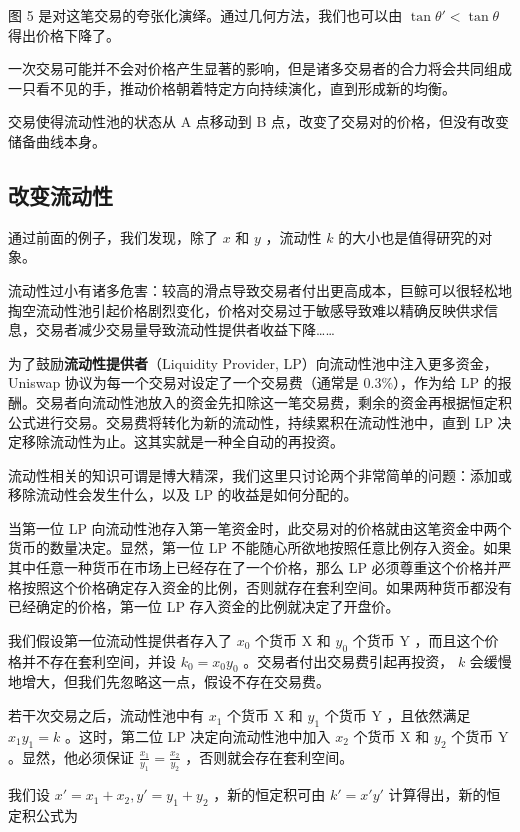 \documentclass[12pt, a4paper, oneside]{ctexart}
\begin{document}
图 5 是对这笔交易的夸张化演绎。通过几何方法，我们也可以由 $\tan \theta' < \tan \theta$ 得出价格下降了。

一次交易可能并不会对价格产生显著的影响，但是诸多交易者的合力将会共同组成一只看不见的手，推动价格朝着特定方向持续演化，直到形成新的均衡。

交易使得流动性池的状态从 A 点移动到 B 点，改变了交易对的价格，但没有改变储备曲线本身。

\subsection{改变流动性}

通过前面的例子，我们发现，除了 $x$ 和 $y$ ，流动性 $k$ 的大小也是值得研究的对象。

流动性过小有诸多危害：较高的滑点导致交易者付出更高成本，巨鲸可以很轻松地掏空流动性池引起价格剧烈变化，价格对交易过于敏感导致难以精确反映供求信息，交易者减少交易量导致流动性提供者收益下降……

为了鼓励\textbf{流动性提供者}（Liquidity Provider, LP）向流动性池中注入更多资金， Uniswap 协议为每一个交易对设定了一个交易费（通常是 $0.3\%$），作为给 LP 的报酬。交易者向流动性池放入的资金先扣除这一笔交易费，剩余的资金再根据恒定积公式进行交易。交易费将转化为新的流动性，持续累积在流动性池中，直到 LP 决定移除流动性为止。这其实就是一种全自动的再投资。

流动性相关的知识可谓是博大精深，我们这里只讨论两个非常简单的问题：添加或移除流动性会发生什么，以及 LP 的收益是如何分配的。

当第一位 LP 向流动性池存入第一笔资金时，此交易对的价格就由这笔资金中两个货币的数量决定。显然，第一位 LP 不能随心所欲地按照任意比例存入资金。如果其中任意一种货币在市场上已经存在了一个价格，那么 LP 必须尊重这个价格并严格按照这个价格确定存入资金的比例，否则就存在套利空间。如果两种货币都没有已经确定的价格，第一位 LP 存入资金的比例就决定了开盘价。

我们假设第一位流动性提供者存入了 $x_0$ 个货币 X 和 $y_0$ 个货币 Y ，而且这个价格并不存在套利空间，并设 $k_0 = x_0y_0$ 。交易者付出交易费引起再投资， $k$ 会缓慢地增大，但我们先忽略这一点，假设不存在交易费。

若干次交易之后，流动性池中有 $x_1$ 个货币 X 和 $y_1$ 个货币 Y ，且依然满足 $x_1y_1=k$ 。这时，第二位 LP 决定向流动性池中加入 $x_2$ 个货币 X 和 $y_2$ 个货币 Y 。显然，他必须保证 $\displaystyle\frac{x_1}{y_1} = \frac{x_2}{y_2}$ ，否则就会存在套利空间。

我们设 $x'=x_1+x_2, y'=y_1+y_2$ ，新的恒定积可由 $k' = x'y'$ 计算得出，新的恒定积公式为
\end{document}
